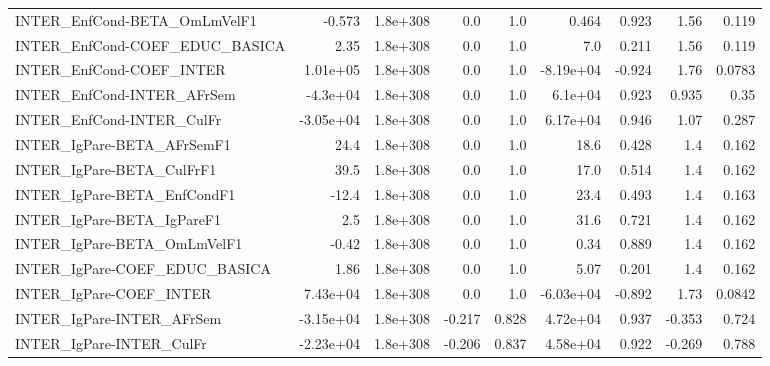 \begin{tabular}{lrrrrrrrr}
INTER\_EnfCond-BETA\_OmLmVelF1          &      -0.573 &     1.8e+308 &     0.0 &      1.0 &      0.464 &       0.923 &         1.56 &         0.119 \\
INTER\_EnfCond-COEF\_EDUC\_BASICA        &        2.35 &     1.8e+308 &     0.0 &      1.0 &        7.0 &       0.211 &         1.56 &         0.119 \\
INTER\_EnfCond-COEF\_INTER              &    1.01e+05 &     1.8e+308 &     0.0 &      1.0 &  -8.19e+04 &      -0.924 &         1.76 &        0.0783 \\
INTER\_EnfCond-INTER\_AFrSem            &    -4.3e+04 &     1.8e+308 &     0.0 &      1.0 &    6.1e+04 &       0.923 &        0.935 &          0.35 \\
INTER\_EnfCond-INTER\_CulFr             &   -3.05e+04 &     1.8e+308 &     0.0 &      1.0 &   6.17e+04 &       0.946 &         1.07 &         0.287 \\
INTER\_IgPare-BETA\_AFrSemF1            &        24.4 &     1.8e+308 &     0.0 &      1.0 &       18.6 &       0.428 &          1.4 &         0.162 \\
INTER\_IgPare-BETA\_CulFrF1             &        39.5 &     1.8e+308 &     0.0 &      1.0 &       17.0 &       0.514 &          1.4 &         0.162 \\
INTER\_IgPare-BETA\_EnfCondF1           &       -12.4 &     1.8e+308 &     0.0 &      1.0 &       23.4 &       0.493 &          1.4 &         0.163 \\
INTER\_IgPare-BETA\_IgPareF1            &         2.5 &     1.8e+308 &     0.0 &      1.0 &       31.6 &       0.721 &          1.4 &         0.162 \\
INTER\_IgPare-BETA\_OmLmVelF1           &       -0.42 &     1.8e+308 &     0.0 &      1.0 &       0.34 &       0.889 &          1.4 &         0.162 \\
INTER\_IgPare-COEF\_EDUC\_BASICA         &        1.86 &     1.8e+308 &     0.0 &      1.0 &       5.07 &       0.201 &          1.4 &         0.162 \\
INTER\_IgPare-COEF\_INTER               &    7.43e+04 &     1.8e+308 &     0.0 &      1.0 &  -6.03e+04 &      -0.892 &         1.73 &        0.0842 \\
INTER\_IgPare-INTER\_AFrSem             &   -3.15e+04 &     1.8e+308 &  -0.217 &    0.828 &   4.72e+04 &       0.937 &       -0.353 &         0.724 \\
INTER\_IgPare-INTER\_CulFr              &   -2.23e+04 &     1.8e+308 &  -0.206 &    0.837 &   4.58e+04 &       0.922 &       -0.269 &         0.788 \\

\end{tabular}
